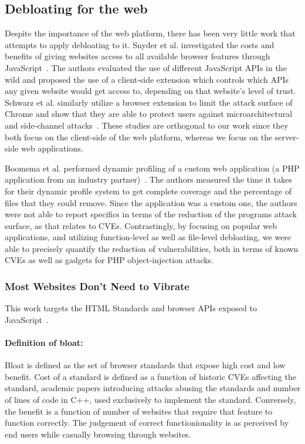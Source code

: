 \subsection{Debloating for the web}
Despite the importance of the web platform, there has been very little work that attempts to apply debloating to it. Snyder et al. investigated the costs and
benefits of giving websites access to all available browser features through
JavaScript~\cite{snyder2017vibrate}. The authors evaluated the use of different
JavaScript APIs in the wild and proposed the use of a client-side extension
which controls which APIs any given website would get access to, depending
on that website's level of trust. Schwarz et al. similarly utilize a browser
extension to limit the attack surface of Chrome and show that they are able
to protect users against microarchitectural and side-channel
attacks~\cite{Schwarz2018}. These studies are orthogonal to our work since
they both focus on the client-side of the web platform, whereas we focus on
the server-side web applications.


Boomsma et al. performed dynamic profiling of a custom web application
(a PHP application from an industry partner)~\cite{boomsma2012Dead}. The
authors measured the time it takes for their dynamic profile system to get
complete coverage and the percentage of files that they could remove. Since the
application was a custom one, the authors were not able to report specifics
in terms of the reduction of the programs attack surface, as that relates
to CVEs. Contrastingly, by focusing on popular web applications, and utilizing function-level as well as file-level debloating, we were
able to precisely quantify the reduction of vulnerabilities, both in terms
of known CVEs as well as gadgets for PHP object-injection attacks.

\subsubsection{Most Websites Don’t Need to Vibrate}
This work targets the HTML Standards and browser APIs exposed to JavaScript~\cite{snyder2017vibrate}.
\paragraph{Definition of bloat:} Bloat is defined as the set of browser standards that expose high cost and low benefit. Cost of a standard is defined as a function of historic CVEs affecting the standard, academic papers introducing attacks abusing the standards and number of lines of code in C++, used exclusively to implement the standard. Conversely, the benefit is a function of number of websites that require that feature to function correctly. The judgement of correct functionionality is as perceived by end users while casually browsing through websites.
